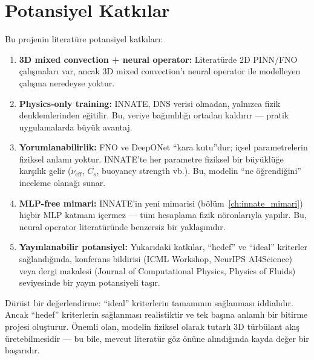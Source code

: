 \section{Potansiyel Katkılar}
\label{sec:katkilar}

Bu projenin literatüre potansiyel katkıları:

\begin{enumerate}
    \item \textbf{3D mixed convection + neural operator:} Literatürde 2D PINN/FNO çalışmaları var, ancak 3D mixed convection'ı neural operator ile modelleyen çalışma neredeyse yoktur.

    \item \textbf{Physics-only training:} INNATE, DNS verisi olmadan, yalnızca fizik denklemlerinden eğitilir. Bu, veriye bağımlılığı ortadan kaldırır --- pratik uygulamalarda büyük avantaj.

    \item \textbf{Yorumlanabilirlik:} FNO ve DeepONet ``kara kutu''dur; içsel parametrelerin fiziksel anlamı yoktur. INNATE'te her parametre fiziksel bir büyüklüğe karşılık gelir ($\nu_{\text{eff}}$, $C_s$, buoyancy strength vb.). Bu, modelin ``ne öğrendiğini'' inceleme olanağı sunar.

    \item \textbf{MLP-free mimari:} INNATE'in yeni mimarisi (bölüm~\ref{ch:innate_mimari}) hiçbir MLP katmanı içermez --- tüm hesaplama fizik nöronlarıyla yapılır. Bu, neural operator literatüründe benzersiz bir yaklaşımdır.

    \item \textbf{Yayınlanabilir potansiyel:} Yukarıdaki katkılar, ``hedef'' ve ``ideal'' kriterler sağlandığında, konferans bildirisi (ICML Workshop, NeurIPS AI4Science) veya dergi makalesi (Journal of Computational Physics, Physics of Fluids) seviyesinde bir yayın potansiyeli taşır.
\end{enumerate}

\begin{remark}
Dürüst bir değerlendirme: ``ideal'' kriterlerin tamamının sağlanması iddialıdır. Ancak ``hedef'' kriterlerin sağlanması realistiktir ve tek başına anlamlı bir bitirme projesi oluşturur. Önemli olan, modelin fiziksel olarak tutarlı 3D türbülant akış üretebilmesidir --- bu bile, mevcut literatür göz önüne alındığında kayda değer bir başarıdır.
\end{remark}
